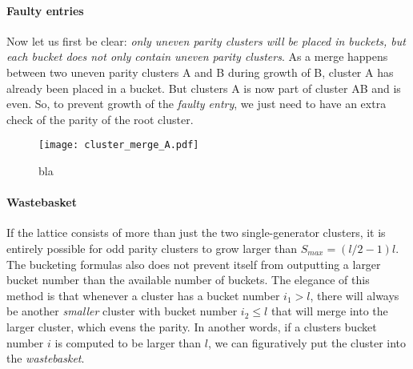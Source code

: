 \paragraph{Faulty entries}
Now let us first be clear: \emph{only uneven parity clusters will be placed in buckets, but each bucket does not only contain uneven parity clusters}. As a merge happens between two uneven parity clusters A and B during growth of B, cluster A has already been placed in a bucket. But clusters A is now part of cluster AB and is even. So, to prevent growth of the \emph{faulty entry}, we just need to have an extra check of the parity of the root cluster.

\begin{figure}
  \centering
  \texttt{[image: cluster\_merge\_A.pdf]}
  \caption{bla}\label{3.fig.clustermergeB}
\end{figure}

\paragraph{Wastebasket}
If the lattice consists of more than just the two single-generator clusters, it is entirely possible for odd parity clusters to grow larger than $S_{max} = (l/2-1)l$. The bucketing formulas also does not prevent itself from outputting a larger bucket number than the available number of buckets. The elegance of this method is that whenever a cluster has a bucket number $i_1>l$, there will always be another \emph{smaller} cluster with bucket number $i_2\leq l$ that will merge into the larger cluster, which evens the parity. In another words, if a clusters bucket number $i$ is computed to be larger than $l$, we can figuratively put the cluster into the \emph{wastebasket}.

